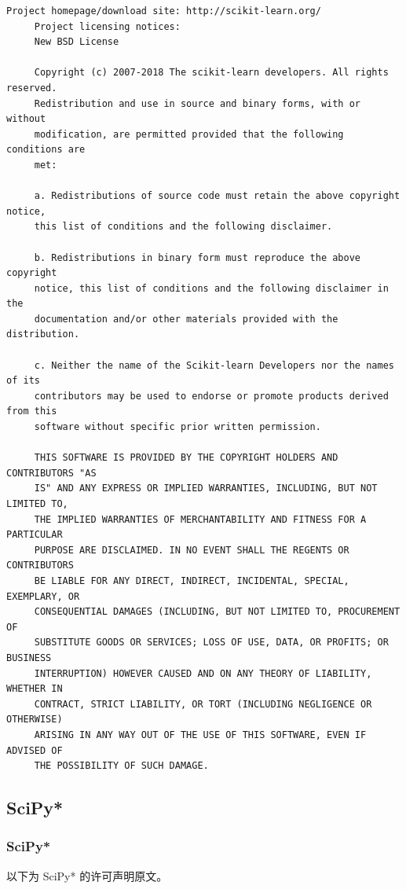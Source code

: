 \begin{lstlisting}[basicstyle=\ttfamily\footnotesize,breaklines=true]
     Project homepage/download site: http://scikit-learn.org/
     Project licensing notices:
     New BSD License

     Copyright (c) 2007-2018 The scikit-learn developers. All rights reserved.
     Redistribution and use in source and binary forms, with or without
     modification, are permitted provided that the following conditions are
     met:

     a. Redistributions of source code must retain the above copyright notice,
     this list of conditions and the following disclaimer.

     b. Redistributions in binary form must reproduce the above copyright
     notice, this list of conditions and the following disclaimer in the
     documentation and/or other materials provided with the distribution.

     c. Neither the name of the Scikit-learn Developers nor the names of its
     contributors may be used to endorse or promote products derived from this
     software without specific prior written permission.

     THIS SOFTWARE IS PROVIDED BY THE COPYRIGHT HOLDERS AND CONTRIBUTORS "AS
     IS" AND ANY EXPRESS OR IMPLIED WARRANTIES, INCLUDING, BUT NOT LIMITED TO,
     THE IMPLIED WARRANTIES OF MERCHANTABILITY AND FITNESS FOR A PARTICULAR
     PURPOSE ARE DISCLAIMED. IN NO EVENT SHALL THE REGENTS OR CONTRIBUTORS
     BE LIABLE FOR ANY DIRECT, INDIRECT, INCIDENTAL, SPECIAL, EXEMPLARY, OR
     CONSEQUENTIAL DAMAGES (INCLUDING, BUT NOT LIMITED TO, PROCUREMENT OF
     SUBSTITUTE GOODS OR SERVICES; LOSS OF USE, DATA, OR PROFITS; OR BUSINESS
     INTERRUPTION) HOWEVER CAUSED AND ON ANY THEORY OF LIABILITY, WHETHER IN
     CONTRACT, STRICT LIABILITY, OR TORT (INCLUDING NEGLIGENCE OR OTHERWISE)
     ARISING IN ANY WAY OUT OF THE USE OF THIS SOFTWARE, EVEN IF ADVISED OF
     THE POSSIBILITY OF SUCH DAMAGE.
\end{lstlisting}

\subsection{SciPy*}
\subsubsection*{SciPy*}

以下为 SciPy* 的许可声明原文。

